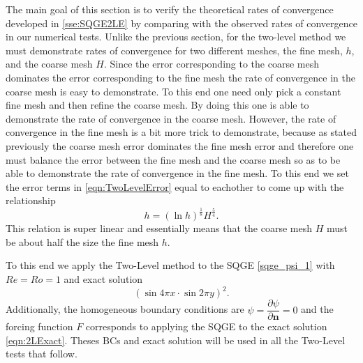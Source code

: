 The main goal of this section is to verify the theoretical rates of convergence developed in
\autoref{sse:SQGE2LE} by comparing with the observed rates of convergence in our numerical tests.
Unlike the previous section, for the two-level method we must demonstrate rates of convergence for
two different meshes, the fine mesh, $h$, and the coarse mesh $H$. Since the error corresponding to
the coarse mesh dominates the error corresponding to the fine mesh the rate of convergence in the
coarse mesh is easy to demonstrate. To this end one need only pick a constant fine mesh and then
refine the coarse mesh. By doing this one is able to demonstrate the rate of convergence in the
coarse mesh. However, the rate of convergence in the fine mesh is a bit more trick to demonstrate,
because as stated previously the coarse mesh error dominates the fine mesh error and therefore one
must balance the error between the fine mesh and the coarse mesh so as to be able to demonstrate the
rate of convergence in the fine mesh. To this end we set the error terms in
\eqref{eqn:TwoLevelError} equal to eachother to come up with the relationship 
\begin{equation}
  h = \left(\ln h\right)^{\frac{1}{8}} H^{\frac{5}{4}}.
  \label{eqn:OrderRelation}
\end{equation}
This relation is super linear and essentially means that the coarse mesh $H$ must be about half the
size the fine mesh $h$. 

To this end we apply the Two-Level method to the SQGE \eqref{sqge_psi_1} with $Re=Ro=1$ and exact
solution
\begin{equation}
  \left(\sin 4\pi x \cdot \sin 2\pi y\right)^2.
  \label{eqn:2LExact}
\end{equation}
Additionally, the homogeneous boundary conditions are $\psi=\dfrac{\partial \psi}{\partial
\mathbf{n}}=0$ and the forcing function $F$ corresponds to applying the SQGE to the exact solution
\eqref{eqn:2LExact}. Theses BCs and exact solution will be used in all the Two-Level tests that
follow.

